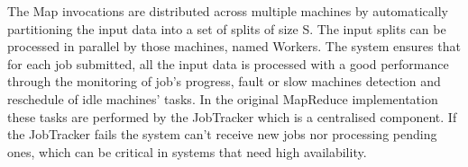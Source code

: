 \documentclass[times, 10pt,twocolumn]{article}
\begin{document}
	The Map invocations are distributed across multiple machines by automatically partitioning the input data into a set of splits of size S. The input splits can be processed in parallel by those machines, named Workers. The system ensures that for each job submitted, all the input data is processed with a good performance through the monitoring of job’s progress, fault or slow machines detection and reschedule of idle machines' tasks.
	In the original MapReduce implementation these tasks are performed by the JobTracker which is a centralised component. If the JobTracker fails the system can't receive new jobs nor processing pending ones, which can be critical in systems that need high availability.
	
	
	
	
	
	
	
	
	
	
	
	
	
	
	
	
\end{document}
